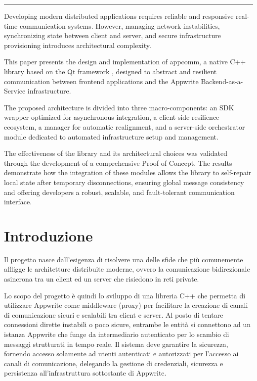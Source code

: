 \documentclass[a4paper, 11pt, twoside]{report}
\newif\ifshowlogo
\newcommand{\blankpage}{
    \clearpage
    \thispagestyle{empty}     %
    \showlogofalse            %
    \hbox{}                   %
    \newpage
    \showlogotrue             %
}
\begin{document}
\vspace{0.5cm}
\noindent\rule{\textwidth}{0.5pt}
\vspace{0.5cm}

\noindent Developing modern distributed applications requires reliable and responsive real-time communication systems. 
However, managing network instabilities, synchronizing state between client and server, and secure infrastructure provisioning
introduces architectural complexity.

This paper presents the design and implementation of appcomm, a native C++ library based on the Qt framework \cite{qt_docs}, 
designed to abstract and resilient communication between frontend applications and the Appwrite \cite{appwrite_docs} 
Backend-as-a-Service infrastructure.

The proposed architecture is divided into three macro-components: an SDK wrapper optimized for asynchronous integration, 
a client-side resilience ecosystem, a manager for automatic realignment, and a server-side orchestrator module dedicated 
to automated infrastructure setup and management.

The effectiveness of the library and its architectural choices was validated through the development of a comprehensive Proof of Concept. 
The results demonstrate how the integration of these modules allows the library to self-repair local state after temporary
disconnections, ensuring global message consistency and offering developers a robust, scalable, and fault-tolerant communication
interface.

\blankpage

\chapter{Introduzione}

Il progetto nasce dall'esigenza di risolvere una delle sfide che più comunemente affligge le architetture distribuite
moderne, ovvero la comunicazione bidirezionale asincrona tra un client ed un server che risiedono in reti private.

Lo scopo del progetto è quindi lo sviluppo di una libreria C++ che permetta di utilizzare Appwrite come middleware
(proxy) per facilitare la creazione di canali di comunicazione sicuri e scalabili tra client e server.
Al posto di tentare connessioni dirette instabili o poco sicure, entrambe le entità si connettono ad un istanza 
Appwrite che funge da intermediario autenticato per lo scambio di messaggi strutturati in tempo reale.
Il sistema deve garantire la sicurezza, fornendo accesso solamente ad utenti autenticati e autorizzati per l'accesso
ai canali di comunicazione, delegando la gestione di credenziali, sicurezza e persistenza all'infrastruttura sottostante
di Appwrite.
\end{document}
